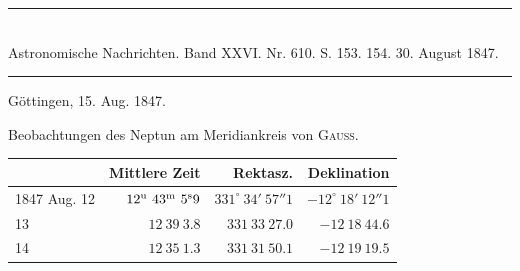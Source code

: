 \clearpage
{}
\hypertarget{native-477-lower}{}
\begin{center}
\rule{0.55\linewidth}{0.4pt}\\[2pt]
Astronomische Nachrichten. Band XXVI. Nr. 610. S. 153. 154. 30. August 1847.\\[2pt]
\rule{0.55\linewidth}{0.4pt}
\end{center}
\begin{flushright}Göttingen, 15. Aug. 1847.\end{flushright}

Beobachtungen des Neptun am Meridiankreis von \textsc{Gauss}.

\begin{center}
\setlength{\tabcolsep}{3pt}
\begin{tabular}{l|r|r|r}
 & Mittlere Zeit & Rektasz. & Deklination \\\hline
1847 Aug. 12 & $12^{\rm u}\ 43^{\rm m}\ 5^{\rm s}9$ & $331^\circ\ 34'\ 57''1$ & $-12^\circ\ 18'\ 12''1$ \\
\hfill 13 & $12\ 39\ 3.8$ & $331\ 33\ 27.0$ & $-12\ 18\ 44.6$ \\
\hfill 14 & $12\ 35\ 1.3$ & $331\ 31\ 50.1$ & $-12\ 19\ 19.5$ \\
\end{tabular}
\end{center}

